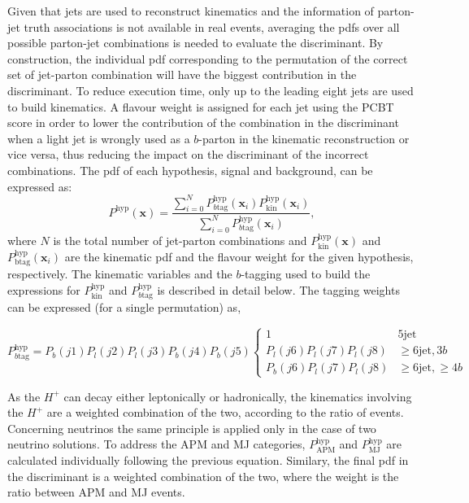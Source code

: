 Given that jets are used to reconstruct kinematics and the information of parton-jet truth associations is not available in real events, averaging the pdfs over all possible parton-jet combinations is needed to evaluate the discriminant. By construction, the individual pdf corresponding to the permutation of the correct set of jet-parton combination will have the biggest contribution in the discriminant. To reduce execution time, only up to the leading eight jets are used to build kinematics. A flavour weight is assigned for each jet using the PCBT score in order to lower the contribution of the combination in the discriminant when a light jet is wrongly used as a $b$-parton in the kinematic reconstruction or vice versa, thus reducing the impact on the discriminant of the incorrect combinations. The pdf of each hypothesis, signal and background, can be expressed as:
\begin{equation}
    P^{\text{hyp}}(\textbf{x})=\frac{\sum_{i=0}^N P^{\text{hyp}}_{b\text{tag}}(\textbf{x}_i)P^{\text{hyp}}_{\text{kin}}(\textbf{x}_i)}{\sum_{i=0}^N P^{\text{hyp}}_{b\text{tag}}(\textbf{x}_i)},
    \label{eq3:PDF}
\end{equation}
where $N$ is the total number of jet-parton combinations and $P^{\text{hyp}}_{\text{kin}}(\textbf{x})$ and $P^{\text{hyp}}_{\text{btag}}(\textbf{x}_i)$ are the kinematic pdf and the flavour weight for the given hypothesis, respectively. The kinematic variables and the $b$-tagging used to build the expressions for $P^{\text{hyp}}_{\text{kin}}$ and $P^{\text{hyp}}_{b\text{tag}}$ is described in detail below. The tagging weights can be expressed (for a single permutation) as,

\begin{equation}
    P^{\text{hyp}}_{b\text{tag}}=P_b(j1)P_l(j2)P_l(j3)P_b(j4)P_b(j5)\begin{cases}1&5\text{jet}\\P_l(j6)P_l(j7)P_l(j8)& \geq6\text{jet},3b\\P_b(j6)P_l(j7)P_l(j8)&\geq6\text{jet},\geq4b\end{cases}
\end{equation}

As the $H^+$ can decay either leptonically or hadronically, the kinematics involving the $H^+$ are a weighted combination of the two, according to the ratio of events. Concerning neutrinos the same principle is applied only in the case of two neutrino solutions. To address the APM and MJ categories, $P^{\text{hyp}}_{\text{APM}}$ and $P^{\text{hyp}}_{\text{MJ}}$ are calculated individually following the previous equation. Similary, the final pdf in the discriminant is a weighted combination of the two, where the weight is the ratio between APM and MJ events.


